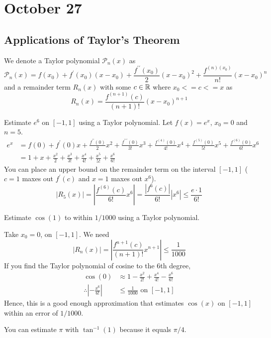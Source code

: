 \section{October 27}

\subsection{Applications of Taylor's Theorem}
\begin{definition}
    We denote a Taylor polynomial $\mathcal{P}_n(x)$ as
    $$\mathcal{P}_n(x)=f\left(x_0\right)+f^{\prime}\left(x_0\right)\left(x-x_0\right)+\frac{f^{\prime \prime}\left(x_0\right)}{2}\left(x-x_0\right)^2+\frac{f^{(n)\left(x_0\right)}}{n !}\left(x-x_0\right)^n$$ 
    and a remainder term $R_n(x)$ with some $c \in \mathbb{R}$ where $x_0 <= c <= x$ as 
    $$R_n(x)=\frac{f^{(n+1)}(c)}{(n+1) !}\left(x-x_0\right)^{n+1}$$
\end{definition}

\begin{example}
    Estimate $e^6$ on $[-1,1]$ using a Taylor polynomial.
    \noindent Let $f(x)=e^x$, $x_0=0$ and $n=5$.
    \begin{align*}
        e^x &=f(0)+f^{\prime}(0) x+\frac{f^{\prime \prime}(0)}{2} x^2+\frac{f^{\prime \prime \prime}(0)}{3 !} x^3+\frac{f^{(4)}(0)}{4 !} x^4+\frac{f^{(5)}(0)}{5 !} x^5+\frac{f^{(6)}(0)}{6 !} x^6 \\
        &=1+x+\frac{x^2}{2}+\frac{x^3}{3 !}+\frac{x^4}{4 !}+\frac{x^5}{5 !}+\frac{x^6}{6 !}
    \end{align*}
    You can place an upper bound on the remainder term on the interval $[-1,1]$ ($c=1$ maxes out $f^{\prime}(c)$ and $x=1$ maxes out $x^6$).
    $$\left|R_5(x)\right|=\left|\frac{f^{(6)}(c)}{6 !} x^6\right|=\frac{\left|f^6(c)\right|}{6 !}\left|x^6\right| \leq \frac{e \cdot 1}{6 !}$$
\end{example}

\begin{example}
    Estimate $\cos (1)$ to within $1 / 1000$ using a Taylor polynomial.

    \noindent Take $x_0=0$, on $[-1,1]$. We need $$\left|R_n(x)\right|=\left|\frac{f^{n+1}(c)}{(n+1) !} x^{n+1}\right| \leq \frac{1}{1000}$$
    If you find the Taylor polynomial of cosine to the 6th degree,
    \begin{align*}
        \cos (0) &\approx 1-\frac{x^2}{2 !}+\frac{x^4}{4 !}-\frac{x^6}{6 !} \\
        \therefore \left|-\frac{x^6}{6 !}\right| &\leq \frac{1}{1000} \text { on }[-1,1]
    \end{align*}
    Hence, this is a good enough approximation that estimates $\cos (x)$ on $[-1,1]$ within an error of $1 / 1000$.
\end{example}
\begin{remark}
    You can estimate $\pi$ with $\tan^{-1}(1)$ because it equals $\pi / 4$.
\end{remark}

